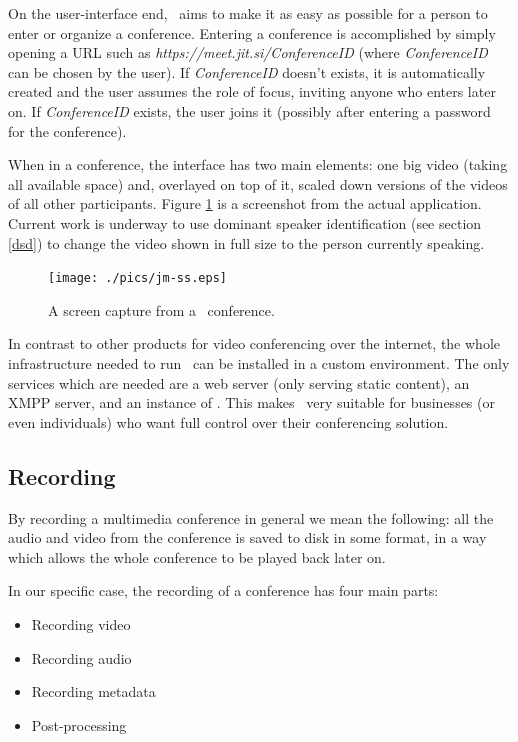 \documentclass[twoside,openright,a4paper,12pt,english]{article}
\begin{document}
\smallskip
On the user-interface end, \jm\ aims to make it as easy as possible for a
person to enter or organize a conference. 
Entering a conference is accomplished by simply opening a URL such as \emph{https://meet.jit.si/ConferenceID} 
(where \emph{ConferenceID} can be chosen by the user). If \emph{ConferenceID}
doesn't exists, it is automatically created and
the user assumes the role of focus, inviting anyone who enters later on. If
\emph{ConferenceID} exists,
the user joins it (possibly after entering a password for the conference).

When in a conference, the interface has two main elements: one big video
(taking all available space) and, overlayed on top of it,
scaled down versions of the videos of all other participants. Figure
\ref{jm-ss} is a screenshot from the actual application. Current work is underway to
use dominant speaker identification (see section \ref{dsd}) to change the video
shown in full size to the person currently speaking.

\begin{figure}[h]
    \texttt{[image: ./pics/jm-ss.eps]}
    \label{jm-ss}
    \caption{A screen capture from a \jm\ conference.}
\end{figure}

\medskip
In contrast to other products for video conferencing over the internet, the
whole infrastructure needed to run \jm\ can be installed in a custom
environment. The only services which are needed are a web server
(only serving static content), an XMPP server, and an instance of \jvb. This
makes \jm\ very suitable for businesses (or even individuals) who want full
control over their conferencing solution.



\subsection{Recording}
\label{intro-recording}
By recording a multimedia conference in general we mean the following: all the
audio and video from the conference
is saved to disk in some format, in a way which allows the whole conference to
be played back later on.

\medskip
In our specific case, the recording of a conference has four main parts:
\begin{itemize}
\item{Recording video}
\item{Recording audio}
\item{Recording metadata}
\item{Post-processing}
\end{itemize}
\end{document}
